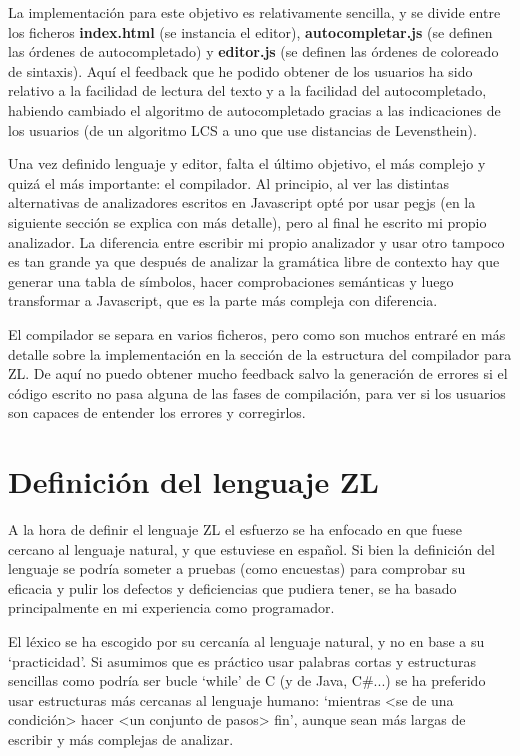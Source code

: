 \documentclass{report}
\begin{document}
	La implementación para este objetivo es relativamente sencilla, y se divide entre los ficheros \textbf{index.html} (se instancia el editor), \textbf{autocompletar.js} (se definen las órdenes de autocompletado) y \textbf{editor.js} (se definen las órdenes de coloreado de sintaxis). Aquí el feedback que he podido obtener de los usuarios ha sido relativo a la facilidad de lectura del texto y a la facilidad del autocompletado, habiendo cambiado el algoritmo de autocompletado gracias a las indicaciones de los usuarios (de un algoritmo LCS\cite{lcs} a uno que use distancias de Levensthein\cite{levensthein}). 
	
	Una vez definido lenguaje y editor, falta el último objetivo, el más complejo y quizá el más importante: el compilador. Al principio, al ver las distintas alternativas de analizadores escritos en Javascript opté por usar pegjs (en la siguiente sección se explica con más detalle), pero al final he escrito mi propio analizador. La diferencia entre escribir mi propio analizador y usar otro tampoco es tan grande ya que después de analizar la gramática libre de contexto hay que generar una tabla de símbolos, hacer comprobaciones semánticas y luego transformar a Javascript, que es la parte más compleja con diferencia.
	
	El compilador se separa en varios ficheros, pero como son muchos entraré en más detalle sobre la implementación en la sección de la estructura del compilador para ZL. De aquí no puedo obtener mucho feedback salvo la generación de errores si el código escrito no pasa alguna de las fases de compilación, para ver si los usuarios son capaces de entender los errores y corregirlos.
	
	\section{Definición del lenguaje ZL}
	
	A la hora de definir el lenguaje ZL el esfuerzo se ha enfocado en que fuese cercano al lenguaje natural, y que estuviese en español\cite{mundoingles}. Si bien la definición del lenguaje se podría someter a pruebas (como encuestas) para comprobar su eficacia y pulir 
	los defectos y deficiencias que pudiera tener, se ha basado principalmente en mi experiencia como programador. 
	
	\vspace{10px}
	
	El léxico se ha escogido por su cercanía al lenguaje natural, y no en base a su `practicidad'. Si asumimos que es práctico usar palabras cortas y estructuras sencillas como podría ser bucle `while' de C (y de Java, C\#...) se ha preferido usar estructuras más cercanas al lenguaje humano: `mientras <se de una condición> hacer <un conjunto de pasos> fin', aunque sean más largas de escribir y más complejas de analizar.
	
\end{document}
